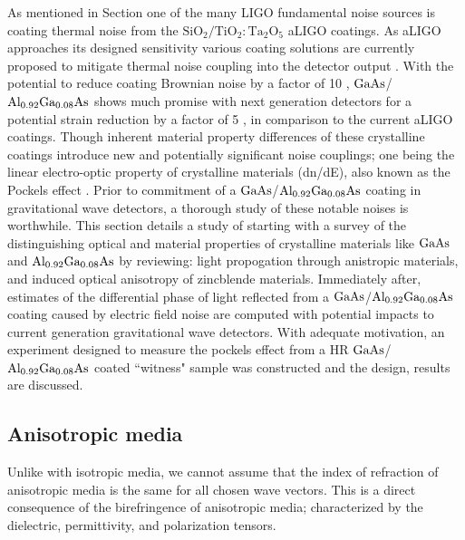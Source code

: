 
 As mentioned in Section \cite{sec:ligo_noise} one of the many LIGO fundamental noise sources is coating thermal noise from the $\mathrm{SiO_2}/\mathrm{TiO_2:Ta_2O_5}$ aLIGO coatings. As aLIGO approaches its designed sensitivity various coating solutions are currently proposed to mitigate thermal noise coupling into the detector output \cite{?}. With the potential to reduce coating Brownian noise by a factor of 10 \cite{Cole:2013}, $\mathrm{GaAs}$/$\mathrm{Al_{0.92}Ga_{0.08}As}$ shows much promise with next generation detectors for a potential strain reduction by a factor of 5 \cite{?}, in comparison to the current aLIGO coatings. Though inherent material property differences of these crystalline coatings introduce new and potentially significant noise couplings; one being the linear electro-optic property of crystalline materials (dn/dE), also known as the Pockels effect \cite{abernathy_poster}. Prior to commitment of a $\mathrm{GaAs}$/$\mathrm{Al_{0.92}Ga_{0.08}As}$ coating in gravitational wave detectors, a thorough study of these notable noises is worthwhile. This section details a study of starting with a survey of the distinguishing optical and material properties of crystalline materials like $\mathrm{GaAs}$ and $\mathrm{Al_{0.92}Ga_{0.08}As}$ by reviewing: light propogation through anistropic materials, and induced optical anisotropy of zincblende materials. Immediately after, estimates of the differential phase of light reflected from a $\mathrm{GaAs}$/$\mathrm{Al_{0.92}Ga_{0.08}As}$ coating caused by electric field noise are computed with potential impacts to current generation gravitational wave detectors. With adequate motivation, an experiment designed to measure the pockels effect from a HR $\mathrm{GaAs}$/$\mathrm{Al_{0.92}Ga_{0.08}As}$ coated ``witness" sample was constructed and the design, results are discussed.

\subsection{Anisotropic media}
Unlike with isotropic media, we cannot assume that the index of refraction of anisotropic media is the same for all chosen wave vectors. This is a direct consequence of the birefringence of anisotropic media; characterized by the dielectric, permittivity, and polarization tensors.

